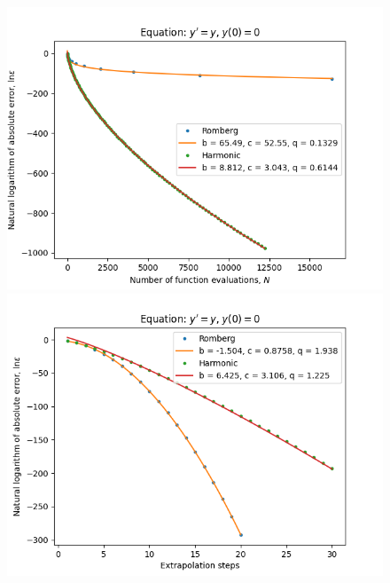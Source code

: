 \begin{figure}[H]
\centering
\begin{minipage}{0.45\textwidth}
\centering
\includegraphics[scale=0.45]{../results/emr_plots/exp_growth_hp_trend.png}
\end{minipage}
\begin{minipage}{0.45\textwidth}
\centering
\includegraphics[scale=0.45]{../results/emr_plots/exp_growth_hp_steps.png}
\end{minipage}
\end{figure}

